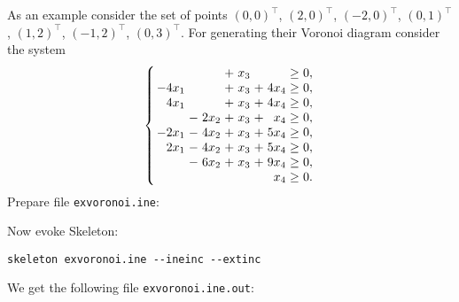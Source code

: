 \documentclass{article}
\newcommand{\Skeleton}{{\sc Skeleton}\xspace}
\newcommand{\transpose}{^{\top}}
\newenvironment{narrowarray}[1]{\arraycolsep=0.15em\begin{array}{#1}}{\end{array}}
\begin{document}
As an example consider the set of points 
$(0,0)\transpose$, 
$(2,0)\transpose$, 
$(-2,0)\transpose$, 
$(0,1)\transpose$, 
$(1,2)\transpose$, 
$(-1,2)\transpose$, 
$(0,3)\transpose$.
For generating their Voronoi diagram 
consider the system
$$
\left\{
\begin{narrowarray}{rcrcrcrcl}
      &   &      & + & x_3 &   &      & \ge & 0, \\
-4x_1 &   &      & + & x_3 & + & 4x_4 & \ge & 0, \\
 4x_1 &   &      & + & x_3 & + & 4x_4 & \ge & 0, \\
      & - & 2x_2 & + & x_3 & + &  x_4 & \ge & 0, \\
-2x_1 & - & 4x_2 & + & x_3 & + & 5x_4 & \ge & 0, \\
 2x_1 & - & 4x_2 & + & x_3 & + & 5x_4 & \ge & 0, \\
      & - & 6x_2 & + & x_3 & + & 9x_4 & \ge & 0, \\
      &   &      &   &     &   &  x_4 & \ge & 0.
\end{narrowarray}
\right.
$$
Prepare file \verb$exvoronoi.ine$:

Now evoke \Skeleton:
\begin{verbatim}
skeleton exvoronoi.ine --ineinc --extinc
\end{verbatim}
We get the following file \verb$exvoronoi.ine.out$:

 
\end{document}
